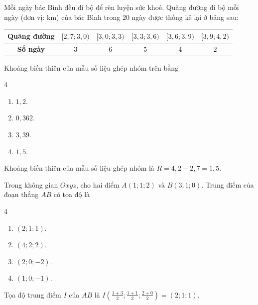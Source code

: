 \begin{baitap}
	Mỗi ngày bác Bình đều đi bộ để rèn luyện sức khoẻ. Quãng đường đi bộ mỗi ngày (đơn vị: $\mathrm{km}$) của bác Bình trong $20$ ngày được thống kê lại ở bảng sau:
	\begin{center}
		\begin{tabular}{|c|c|c|c|c|c|}
			\hline
			\textbf{Quãng đường} & $[2{,}7; 3{,}0)$ & $[3{,}0; 3{,}3)$ & $[3{,}3; 3{,}6)$ & $[3{,}6; 3{,}9)$ & $[3{,}9; 4{,}2)$ \\
			\hline
			\textbf{Số ngày} & $3$ & $6$ & $5$ & $4$ & $2$ \\
			\hline
		\end{tabular}
	\end{center}
	Khoảng biến thiên của mẫu số liệu ghép nhóm trên bằng
	\begin{multicols}{4}
		\begin{enumerate}
			\item $1{,}2$.
			\item $0{,}362$.
			\item $3{,}39$.
			\item $1{,}5$.
		\end{enumerate}
	\end{multicols}
	\begin{traloi}
		Khoảng biến thiên của mẫu số liệu ghép nhóm là $R = 4{,}2 - 2{,}7 = 1{,}5$.
	\end{traloi}
\end{baitap}		
\begin{baitap}
	Trong không gian $Oxyz$, cho hai điểm $A(1; 1; 2)$ và $B(3; 1; 0)$. Trung điểm của đoạn thẳng $AB$ có tọa độ là
	\begin{multicols}{4}
		\begin{enumerate}
			\item $(2; 1; 1)$.
			\item $(4; 2; 2)$.
			\item $(2; 0; -2)$.
			\item $(1; 0; -1)$.
		\end{enumerate}
	\end{multicols}
	\begin{traloi}
		\dapan{A}
		Tọa độ trung điểm $I$ của $AB$ là $I\left(\frac{1+3}{2}; \frac{1+1}{2}; \frac{2+0}{2}\right) = (2; 1; 1)$.
	\end{traloi}
\end{baitap}

